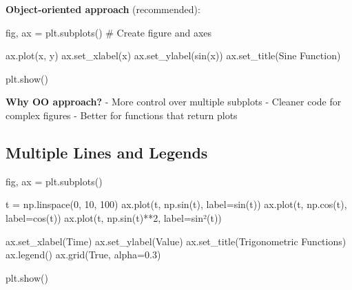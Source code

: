 \documentclass[
  letterpaper,
  DIV=11,
  numbers=noendperiod]{scrartcl}
\newenvironment{Shaded}{\begin{snugshade}}{\end{snugshade}}
\newcommand{\CommentTok}[1]{\textcolor[rgb]{0.37,0.37,0.37}{#1}}
\newcommand{\DecValTok}[1]{\textcolor[rgb]{0.68,0.00,0.00}{#1}}
\newcommand{\FloatTok}[1]{\textcolor[rgb]{0.68,0.00,0.00}{#1}}
\newcommand{\NormalTok}[1]{\textcolor[rgb]{0.00,0.23,0.31}{#1}}
\newcommand{\OperatorTok}[1]{\textcolor[rgb]{0.37,0.37,0.37}{#1}}
\newcommand{\StringTok}[1]{\textcolor[rgb]{0.13,0.47,0.30}{#1}}
\newcommand{\VariableTok}[1]{\textcolor[rgb]{0.07,0.07,0.07}{#1}}
\begin{document}
\textbf{Object-oriented approach} (recommended):

\begin{Shaded}
\begin{Highlighting}[]
\NormalTok{fig, ax }\OperatorTok{=}\NormalTok{ plt.subplots()  }\CommentTok{\# Create figure and axes}

\NormalTok{ax.plot(x, y)}
\NormalTok{ax.set\_xlabel(}\StringTok{\textquotesingle{}x\textquotesingle{}}\NormalTok{)}
\NormalTok{ax.set\_ylabel(}\StringTok{\textquotesingle{}sin(x)\textquotesingle{}}\NormalTok{)}
\NormalTok{ax.set\_title(}\StringTok{\textquotesingle{}Sine Function\textquotesingle{}}\NormalTok{)}

\NormalTok{plt.show()}
\end{Highlighting}
\end{Shaded}

\textbf{Why OO approach?} - More control over multiple subplots -
Cleaner code for complex figures - Better for functions that return
plots

\subsection{Multiple Lines and
Legends}\label{multiple-lines-and-legends}

\begin{Shaded}
\begin{Highlighting}[]
\NormalTok{fig, ax }\OperatorTok{=}\NormalTok{ plt.subplots()}

\NormalTok{t }\OperatorTok{=}\NormalTok{ np.linspace(}\DecValTok{0}\NormalTok{, }\DecValTok{10}\NormalTok{, }\DecValTok{100}\NormalTok{)}
\NormalTok{ax.plot(t, np.sin(t), label}\OperatorTok{=}\StringTok{\textquotesingle{}sin(t)\textquotesingle{}}\NormalTok{)}
\NormalTok{ax.plot(t, np.cos(t), label}\OperatorTok{=}\StringTok{\textquotesingle{}cos(t)\textquotesingle{}}\NormalTok{)}
\NormalTok{ax.plot(t, np.sin(t)}\OperatorTok{**}\DecValTok{2}\NormalTok{, label}\OperatorTok{=}\StringTok{\textquotesingle{}sin²(t)\textquotesingle{}}\NormalTok{)}

\NormalTok{ax.set\_xlabel(}\StringTok{\textquotesingle{}Time\textquotesingle{}}\NormalTok{)}
\NormalTok{ax.set\_ylabel(}\StringTok{\textquotesingle{}Value\textquotesingle{}}\NormalTok{)}
\NormalTok{ax.set\_title(}\StringTok{\textquotesingle{}Trigonometric Functions\textquotesingle{}}\NormalTok{)}
\NormalTok{ax.legend()}
\NormalTok{ax.grid(}\VariableTok{True}\NormalTok{, alpha}\OperatorTok{=}\FloatTok{0.3}\NormalTok{)}

\NormalTok{plt.show()}
\end{Highlighting}
\end{Shaded}
\end{document}
